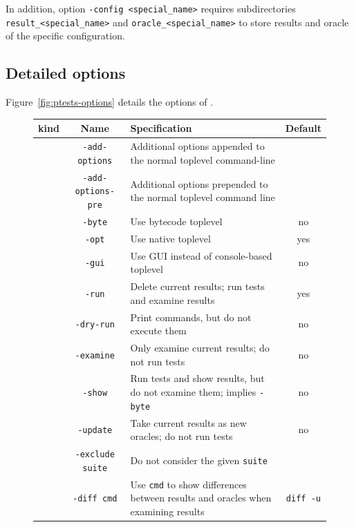 \begin{important}
In addition, option \texttt{-config <special\_name>} requires subdirectories
\texttt{result\_<special\_name>} and \texttt{oracle\_<special\_name>} to store
results and oracle of the specific configuration.
\end{important}

\subsection{Detailed options}\label{ptests:options}

Figure~\ref{fig:ptests-options} details the options of \ptests.
\begin{figure}[ht]
\begin{center}
\begin{tabular}{|c|c|p{6cm}|c|}
\hline
\textbf{kind} & \textbf{Name} & \textbf{Specification} & \textbf{Default}\\
\hline
\hline \multirow{3}{16mm}{\centering{Toplevel}}
& \texttt{-add-options} & 
  Additional options appended to the normal toplevel command-line & \\
& \texttt{-add-options-pre} &
   Additional options prepended to the normal toplevel command line & \\
& \texttt{-byte} & Use bytecode toplevel & no \\
& \texttt{-opt} & Use native toplevel & yes \\
& \texttt{-gui} & Use GUI instead of console-based toplevel & no \\
\hline \multirow{5}{16mm}{\centering{Behavior}}
& \texttt{-run} & Delete current results; run tests and examine results & yes
\\
& \texttt{-dry-run} & Print commands, but do not execute them & no
\\
& \texttt{-examine} & Only examine current results; do not run tests & no \\
& \texttt{-show} & Run tests and show results, but do not examine
                   them; implies \texttt{-byte} &
no \\
& \texttt{-update} & Take current results as new oracles\index{Oracle}; do not
run tests & no \\
\hline \multirow{4}{16mm}{\centering{Misc.}}
& \texttt{-exclude suite} & Do not consider the given \texttt{suite} &
\\
& \texttt{-diff cmd} & Use \texttt{cmd} to show differences between
results and oracles when examining results
& \texttt{diff -u} \\

\end{tabular}
\end{center}
\end{figure}
